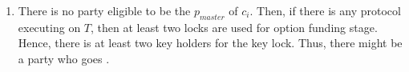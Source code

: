 \begin{enumerate}
    
    
    \item There is no party eligible to be the $p_{master}$ of $c_i$. 
    Then, if there is any protocol executing on $T$, then at least two locks are used for option funding stage. Hence, there is at least two key holders for the \Atwo key lock. Thus, there might be a party who goes \underwater.
    
\end{enumerate}


